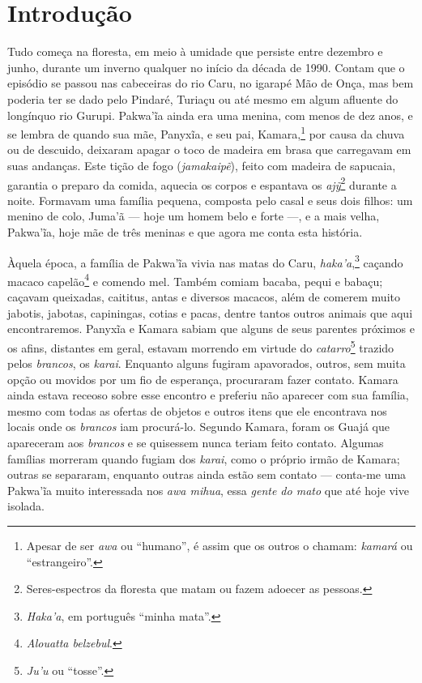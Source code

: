 \chapter{Introdução}
\pagestyle{plain}


Tudo começa na floresta, em meio à umidade que persiste entre dezembro e
junho, durante um inverno qualquer no início da década de 1990. Contam
que o episódio se passou nas cabeceiras do rio Caru, no igarapé
Mão de Onça, mas bem poderia ter se dado pelo Pindaré, Turiaçu ou até
mesmo em algum afluente do longínquo rio Gurupi. Pakwa'ĩa ainda era uma
menina, com menos de dez anos, e se lembra de quando sua mãe, Panyxĩa, e
seu pai, Kamara,\footnote{Apesar de ser \textit{awa} ou ``humano'', é assim que
os outros o chamam: \textit{kamará} ou ``estrangeiro''.} por causa da chuva ou
de descuido, deixaram apagar o toco de madeira em brasa que carregavam
em suas andanças. Este tição de fogo (\textit{jamakaipẽ}), feito com
madeira de sapucaia, garantia o preparo da comida, aquecia os corpos e
espantava os \textit{ajỹ}\footnote{Seres-espectros da floresta que matam ou fazem
adoecer as pessoas.} durante a noite. Formavam uma família pequena,
composta pelo casal e seus dois filhos: um menino de colo, Juma'ã --- hoje
um homem belo e forte ---, e a mais velha, Pakwa'ĩa, hoje mãe de três
meninas e que agora me conta esta história.

Àquela época, a família de Pakwa'ĩa vivia nas matas do Caru,
\textit{haka'a},\footnote{\textit{Haka'a}, em português ``minha mata''.} caçando macaco capelão\footnote{\textit{Alouatta
belzebul}.} e comendo mel. Também comiam bacaba, pequi e babaçu; caçavam
queixadas, caititus, antas e diversos macacos, além de comerem muito
jabotis, jabotas, capiningas, cotias e pacas, dentre tantos outros
animais que aqui encontraremos. Panyxĩa e Kamara sabiam que alguns de
seus parentes próximos e os afins, distantes em geral, estavam morrendo
em virtude do \textit{catarro}\footnote{\textit{Ju'u} ou ``tosse''.} trazido pelos
\textit{brancos}, os \textit{karai}. Enquanto alguns fugiram apavorados,
outros, sem muita opção ou movidos por um fio de esperança, procuraram
fazer contato. Kamara ainda estava receoso sobre esse encontro e
preferiu não aparecer com sua família, mesmo com todas as ofertas de
objetos e outros itens que ele encontrava nos locais onde os
\textit{brancos} iam procurá-lo. Segundo Kamara, foram os Guajá que
apareceram aos \textit{brancos} e se quisessem nunca teriam feito contato. Algumas famílias morreram quando fugiam dos \textit{karai}, como
o próprio irmão de Kamara; outras se separaram, enquanto outras ainda
estão sem contato --- conta-me uma Pakwa'ĩa muito interessada nos
\textit{awa mihua}, essa \textit{gente do mato} que até hoje vive isolada.

